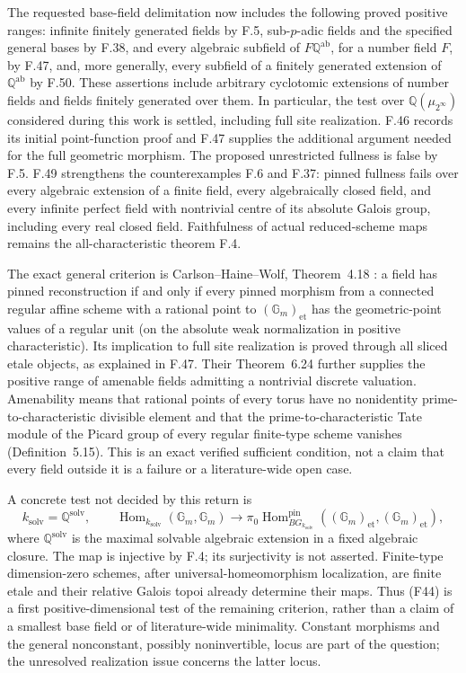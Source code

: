 The requested base-field delimitation now includes the following
proved positive ranges: infinite finitely generated fields by F.5,
sub-$p$-adic fields and the specified general bases by F.38, and
every algebraic subfield of $F\mathbb Q^{\mathrm{ab}}$, for a
number field $F$, by F.47, and, more generally, every subfield of
a finitely generated extension of $\mathbb Q^{\mathrm{ab}}$ by
F.50. These assertions include arbitrary cyclotomic extensions of
number fields and fields finitely generated over them. In particular, the test
over $\mathbb Q(\mu_{2^\infty})$ considered during this work is
settled, including full site realization. F.46 records its initial
point-function proof and F.47 supplies the additional argument
needed for the full geometric morphism. The proposed unrestricted
fullness is false by F.5. F.49 strengthens the counterexamples
F.6 and F.37: pinned fullness fails over every algebraic extension
of a finite field, every algebraically closed field, and every
infinite perfect field with nontrivial centre of its absolute
Galois group, including every real closed field.
Faithfulness of actual reduced-scheme maps remains
the all-characteristic theorem F.4.

The exact general criterion is Carlson--Haine--Wolf,
Theorem~4.18 \cite{CHW2024}: a field has pinned reconstruction if
and only if every pinned morphism from a connected regular affine
scheme with a rational point to $(\mathbb G_m)_{\mathrm{et}}$
has the geometric-point values of a regular unit (on the absolute
weak normalization in positive characteristic). Its implication to
full site realization is proved through all sliced etale objects,
as explained in F.47. Their Theorem~6.24 further supplies the
positive range of amenable fields admitting a nontrivial discrete
valuation. Amenability means that rational points of every torus
have no nonidentity prime-to-characteristic divisible element and
that the prime-to-characteristic Tate module of the Picard group of
every regular finite-type scheme vanishes (Definition~5.15).
This is an exact verified sufficient condition, not a claim that
every field outside it is a failure or a literature-wide open case.

A concrete test not decided by this return is
\[
 k_{\mathrm{solv}}=\mathbb Q^{\mathrm{solv}},\qquad
 \operatorname{Hom}_{k_{\mathrm{solv}}}(\mathbb G_m,\mathbb G_m)
 \longrightarrow
 \pi_0\operatorname{Hom}^{\mathrm{pin}}_{B G_{k_{\mathrm{solv}}}}
       ((\mathbb G_m)_{\mathrm{et}},(\mathbb G_m)_{\mathrm{et}}),
 \tag{F44}
\]
where $\mathbb Q^{\mathrm{solv}}$ is the maximal solvable algebraic
extension in a fixed algebraic closure. The map is injective by
F.4; its surjectivity is not asserted. Finite-type dimension-zero
schemes, after universal-homeomorphism localization, are finite
etale and their relative Galois topoi already determine their maps.
Thus (F44) is a first positive-dimensional test of the remaining
criterion, rather than a claim of a smallest base field or of
literature-wide minimality. Constant morphisms and the general
nonconstant, possibly noninvertible, locus are part of the question;
the unresolved realization issue concerns the latter locus.

